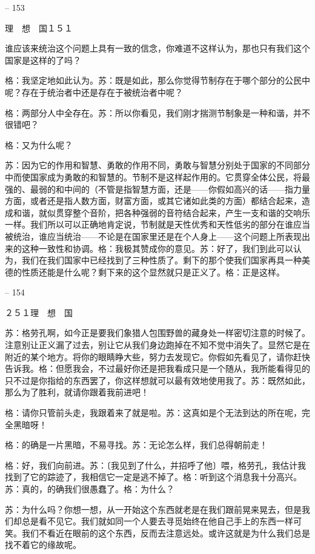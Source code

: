 \documentclass[11pt,oneside]{book}
\begin{document}
\begin{common-format}
-- 153

    理　想　国１５１

    谁应该来统治这个问题上具有一致的信念，你难道不这样认为，那也只有我们这个国家是这样的了吗？

    格：我坚定地如此认为。苏：既是如此，那么你觉得节制存在于哪个部分的公民中呢？存在于统治者中还是存在于被统治者中呢？

    格：两部分人中全存在。苏：所以你看见，我们刚才揣测节制象是一种和谐，并不很错吧？

    格：又为什么呢？

    苏：因为它的作用和智慧、勇敢的作用不同，勇敢与智慧分别处于国家的不同部分中而使国家成为勇敢的和智慧的。节制不是这样起作用的。它贯穿全体公民，将最强的、最弱的和中间的（不管是指智慧方面，还是——你假如高兴的话——指力量方面，或者还是指人数方面，财富方面，或其它诸如此类的方面）都结合起来，造成和谐，就似贯穿整个音阶，把各种强弱的音符结合起来，产生一支和谐的交响乐一样。我们所以可以正确地肯定说，节制就是天性优秀和天性低劣的部分在谁应当被统治，谁应当统治——不论是在国家里还是在个人身上——这个问题上所表现出来的这种一致性和协调。格：我极其赞成你的意见。苏：好了，我们到此可以认为，我们在我们国家中已经找到了三种性质了。剩下的那个使我们国家再具一种美德的性质还能是什么呢？剩下来的这个显然就只是正义了。格：正是这样。

    

-- 154

    ２５１理　想　国

    苏：格劳孔啊，如今正是要我们象猎人包围野兽的藏身处一样密切注意的时候了。注意别让正义漏了过去，别让它从我们身边跑掉在不知不觉中消失了。显然它是在附近的某个地方。将你的眼睛睁大些，努力去发现它。你假如先看见了，请你赶快告诉我。格：但愿我会，不过最好你还是把我看成只是一个随从，我所能看得见的只不过是你指给的东西罢了，你这样想就可以最有效地使用我了。苏：既然如此，那么为了胜利，就请你跟着我前进吧！

    格：请你只管前头走，我跟着来了就是啦。苏：这真如是个无法到达的所在呢，完全黑暗呀！

    格：的确是一片黑暗，不易寻找。苏：无论怎么样，我们总得朝前走！

    格：好，我们向前进。苏：〔我见到了什么，并招呼了他〕喂，格劳孔，我估计我找到了它的踪迹了，我相信它一定是逃不掉了。格：听到这个消息我十分高兴。苏：真的，的确我们很愚蠢了。格：为什么？

    苏：为什么吗？你想一想，从一开始这个东西就老是在我们跟前晃来晃去，但是我们却总是看不见它。我们就如同一个人要去寻觅始终在他自己手上的东西一样可笑。我们不看近在眼前的这个东西，反而去注意远处。或许这就是为什么我们总是找不着它的缘故呢。


\end{common-format}
\end{document}
